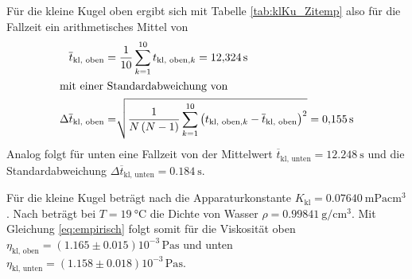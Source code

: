Für die kleine Kugel oben ergibt sich mit Tabelle \ref{tab:klKu_Zitemp} 
also für die Fallzeit ein arithmetisches Mittel von%
%
\begin{align*}
    \overline{t}_{\text{kl, oben}} &= \frac{1}{10} \sum_{k=1}^{10} {t_{\text{kl, oben}, k}} = \qty[]{12.324}{\s}\\%
%
\intertext{mit einer Standardabweichung von}%
%
    \Delta \overline{t}_{\text{kl, oben}} &= 
    \sqrt[]{\frac{1}{N \left(N-1\right)} \sum_{k=1}^{10} \left(t_{\text{kl, oben}, k} - \overline{t}_{\text{kl, oben}}\right)^2}
    = \qty[]{0.155}{\s}\\%
\end{align*}
Analog folgt für unten eine Fallzeit von der Mittelwert $\overline{t}_{\text{kl, unten}} = \qty[]{12.248}{\s}$
und die Standardabweichung $\Delta\overline{t}_{\text{kl, unten}} = \qty[]{0.184}{\s}$.



Für die kleine Kugel beträgt nach \cite*[]{va207} die Apparaturkonstante $K_{\text{kl}} = \qty[]{0.07640}{\milli\Pa \cubic\cm}$.
Nach \cite[]{geschke} beträgt bei $T = \qty{19}{\degreeCelsius}$ die Dichte von Wasser $\rho = \qty{0.99841}{\g \per \cm^3}$.
Mit Gleichung \eqref{eq:empirisch} folgt somit für die Viskosität oben $\eta_{\text{kl, oben}} = \left(1.165 \pm 0.015\right) 10^{-3} \, \unit{\pascal \s}$
und unten $\eta_{\text{kl, unten}} = \left(1.158 \pm 0.018\right) 10^{-3} \, \unit{\pascal \s}$.

